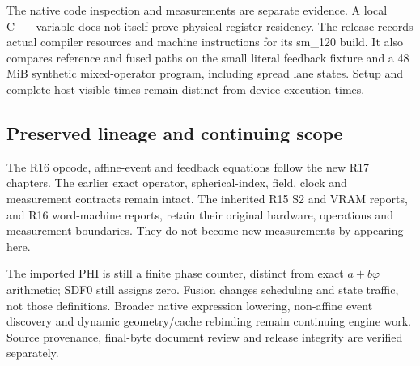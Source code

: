 The native code inspection and measurements are separate evidence. A local
C++ variable does not itself prove physical register residency. The release
records actual compiler resources and machine instructions for its sm\_120
build. It also compares reference and fused paths on the small literal
feedback fixture and a 48 MiB synthetic mixed-operator program, including
spread lane states. Setup and complete host-visible times remain distinct
from device execution times.

\subsection*{Preserved lineage and continuing scope}
The R16 opcode, affine-event and feedback equations follow the new R17
chapters. The earlier exact operator, spherical-index, field, clock and
measurement contracts remain intact. The inherited R15 S2 and VRAM reports,
and R16 word-machine reports, retain their original hardware, operations and
measurement boundaries. They do not become new measurements by appearing here.

The imported PHI is still a finite phase counter, distinct from exact
$a+b\varphi$ arithmetic; SDF0 still assigns zero. Fusion changes scheduling
and state traffic, not those definitions. Broader native expression lowering,
non-affine event discovery and dynamic geometry/cache rebinding remain
continuing engine work. Source provenance, final-byte document review and
release integrity are verified separately.
\clearpage
